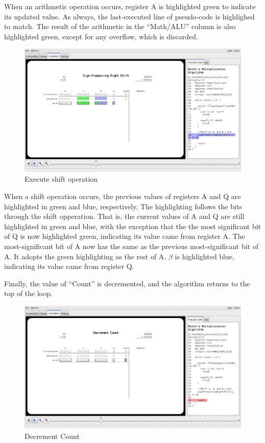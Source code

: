 \documentclass{article}
\begin{document}
When an arithmetic operation occurs, register A is highlighted green to indicate its updated value.
As always, the last-executed line of pseudo-code is highlighed to match.
The result of the arithmetic in the ``Math/ALU'' column is also highlighted green, except for any overflow, which is discarded.

\pagebreak
\begin{figure}[h]
\centering
\includegraphics[scale=0.3]{shift.pdf}
\caption{Execute shift operation}
\end{figure}

When a shift operation occurs, the previous values of registers A and Q are highlighted in green and blue, respectively.
The highlighting follows the bits through the shift opperation.
That is, the current values of A and Q are still highlighted in green and blue, with the exception that the the most significant bit of Q is now highlighted green, indicating its value came from register A.
The most-significant bit of A now has the same as the previous most-significant bit of A.
It adopts the green highlighting as the rest of A.%
$\beta$ is highlighted blue, indicating its value came from register Q.

\pagebreak
Finally, the value of ``Count'' is decremented, and the algorithm returns to the top of the loop.

\begin{figure}[h]
\centering
\includegraphics[scale=0.3]{dec.pdf}
\caption{Decrement Count}
\end{figure}
\end{document}
